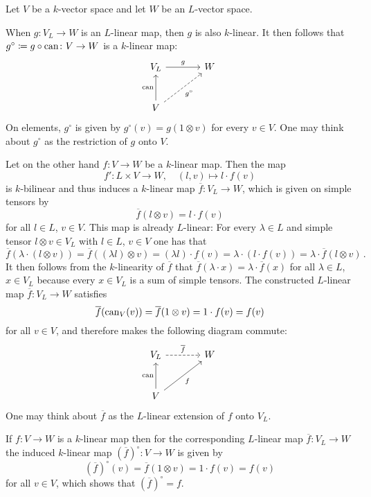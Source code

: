 \begin{fluff}
  Let $V$ be a $k$-vector space and let $W$ be an $L$-vector space.
  
  When $g \colon V_L \to W$ is an $L$-linear map, then $g$ is also $k$-linear.
  It then follows that $g^\circ \coloneqq g \circ \operatorname{can} \colon V \to W$ is a $k$-linear map:
  \[
    \begin{tikzcd}[sep = large]
        V_L
        \arrow{r}[above]{g}
      & W
      \\
        V
        \arrow{u}[left]{\can}
        \arrow[dashed]{ru}[below right]{g^\circ}
      & {}
    \end{tikzcd}
  \]
  On elements, $g^\circ$ is given by $g^\circ(v) = g(1 \otimes v)$ for every $v \in V$.
  One may think about $g^\circ$ as the restriction of $g$ onto $V$.
  
  Let on the other hand $f \colon V \to W$ be a $k$-linear map.
  Then the map
  \[
            f'
    \colon  L \times V
    \to     W,
    \quad   (l,v)
    \mapsto l \cdot f(v)
  \]
  is $k$-bilinear and thus induces a $k$-linear map $\overline{f} \colon V_L \to W$, which is given on simple tensors by
  \[
      \overline{f}(l \otimes v)
    = l \cdot f(v)
  \]
  for all $l \in L$, $v \in V$.
  This map is already $L$-linear:
  For every $\lambda \in L$ and simple tensor $l \otimes v \in V_L$ with $l \in L$, $v \in V$ one has that
  \[
      \overline{f}(\lambda \cdot (l \otimes v))
    = \overline{f}( (\lambda l) \otimes v )
    = (\lambda l) \cdot f(v)
    = \lambda \cdot (l \cdot f(v))
    = \lambda \cdot \overline{f}(l \otimes v) \,.
  \]
  It then follows from the $k$-linearity of $\overline{f}$ that $\overline{f}(\lambda \cdot x) = \lambda \cdot \overline{f}(x)$ for all $\lambda \in L$, $x \in V_L$ because every $x \in V_L$ is a sum of simple tensors.
  The constructed $L$-linear map $\overline{f} \colon V_L \to W$ satisfies
  \[
      \overline{f}(\operatorname{can}_V(v))
    = \overline{f}(1 \otimes v)
    = 1 \cdot f(v)
    = f(v)
  \]
  for all $v \in V$, and therefore makes the following diagram commute:
    \[
      \begin{tikzcd}[sep = large]
          V_L
          \arrow[dashed]{r}[above]{\overline{f}}
        & W
        \\
          V
          \arrow{u}[left]{\can}
          \arrow{ru}[below right]{f}
        & {}
      \end{tikzcd}
    \]
  One may think about $\overline{f}$ as the $L$-linear extension of $f$ onto $V_L$.
  
  If $f \colon V \to W$ is a $k$-linear map then for the corresponding $L$-linear map $\overline{f} \colon V_L \to W$ the induced $k$-linear map $(\overline{f})^\circ \colon V \to W$ is given by
  \[
      (\overline{f})^\circ(v)
    = \overline{f}(1 \otimes v)
    = 1 \cdot f(v)
    = f(v)
  \]
  for all $v \in V$, which shows that $(\overline{f})^\circ = f$.
  

\end{fluff}
